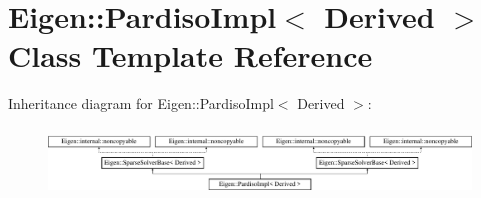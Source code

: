 \hypertarget{class_eigen_1_1_pardiso_impl}{}\section{Eigen\+:\+:Pardiso\+Impl$<$ Derived $>$ Class Template Reference}
\label{class_eigen_1_1_pardiso_impl}
Inheritance diagram for Eigen\+:\+:Pardiso\+Impl$<$ Derived $>$\+:\begin{figure}[H]
\begin{center}
\leavevmode
\includegraphics[height=1.810345cm]{class_eigen_1_1_pardiso_impl}
\end{center}
\end{figure}
